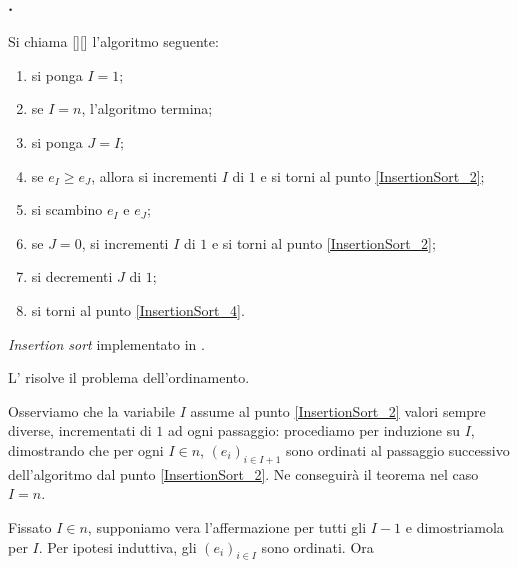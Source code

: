 \subsubsection{.}
\label{AlgoritmiEStruttureDiDati_InsertionSort}
\begin{Definition}
	Si chiama
  [][]
  l'algoritmo seguente:
	\begin{enumerate}
		\item\label{InsertionSort_1} si ponga $I = 1$;
		\item\label{InsertionSort_2} se $I = n$, l'algoritmo termina;
		\item\label{InsertionSort_3} si ponga $J = I$;
		\item\label{InsertionSort_4} se $e_I \geq e_J$, allora si incrementi $I$ di
      $1$ e si torni al punto \ref{InsertionSort_2};
		\item\label{InsertionSort_5} si scambino $e_I$ e $e_J$;
		\item\label{InsertionSort_6} se $J = 0$, si incrementi $I$ di $1$ e si torni
      al punto \ref{InsertionSort_2};
		\item\label{InsertionSort_7} si decrementi $J$ di $1$;
		\item\label{InsertionSort_8} si torni al punto \ref{InsertionSort_4}.
	\end{enumerate}
\end{Definition}
\begin{listing}
	\caption{\textit{Insertion sort} implementato in .}
\end{listing}
\begin{Theorem}
	L' risolve il problema dell'ordinamento.
\end{Theorem}
\Proof Osserviamo che la variabile $I$ assume al punto \ref{InsertionSort_2}
valori sempre diverse, incrementati di $1$ ad ogni passaggio: procediamo per
induzione su $I$, dimostrando che per ogni $I \in n$, $(e_i)_{i \in I + 1}$ sono
ordinati al passaggio successivo dell'algoritmo dal punto \ref{InsertionSort_2}.
Ne conseguir\`a il teorema nel caso $I = n$.
\par Fissato $I \in n$, supponiamo vera l'affermazione per tutti gli $I - 1$ e
dimostriamola per $I$. Per ipotesi induttiva, gli $(e_i)_{i \in I}$ sono
ordinati. Ora
